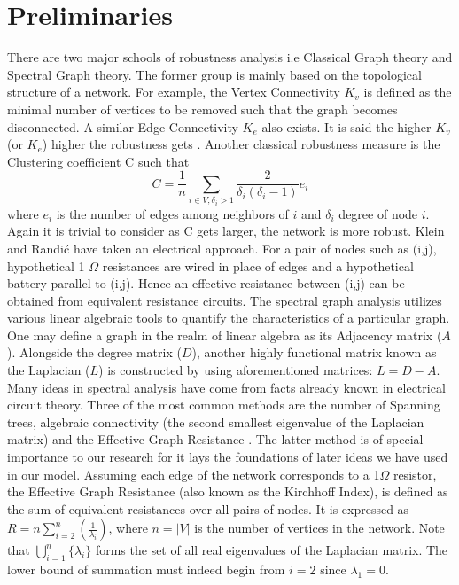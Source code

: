 \documentclass{article}
\begin{document}
	\section{Preliminaries}
	There are two major schools of robustness analysis i.e Classical Graph theory and Spectral Graph theory. The former group is mainly based on the topological structure of a network. For example, the Vertex Connectivity $K_v$ is defined as the minimal number of vertices to be removed such that the graph becomes disconnected. A similar Edge Connectivity $K_e$ also exists. It is said the higher $K_v$ (or $K_e$) higher the robustness gets \cite{ellens2013graph}. Another classical robustness measure is the Clustering coefficient \cite{watts1998collective} C such that
	\begin{equation}
		C = \frac{1}{n} \sum_{i\in V;\delta_i>1}\frac{2}{\delta_i(\delta_i -1)}e_i
	\end{equation}
	where $e_i$ is the number of edges among neighbors of $i$ and $\delta_i$ degree of node $i$. Again it is trivial to consider as C gets larger, the network is more robust.
	Klein and Randi\'{c} \cite{klein1993m} have taken an electrical approach. For a pair of nodes such as (i,j), hypothetical 1 $\Omega$ resistances are wired in place of edges and a hypothetical battery parallel to (i,j). Hence an effective resistance between (i,j) can be obtained from equivalent resistance circuits.
	The spectral graph analysis utilizes various linear algebraic tools to quantify the characteristics of a particular graph. One may define a graph in the realm of linear algebra as its Adjacency matrix ($A$). Alongside the degree matrix ($D$), another highly functional matrix known as the Laplacian ($L$) is constructed by using aforementioned matrices: $L=D-A$. Many ideas in spectral analysis have come from facts already known in electrical circuit theory. Three of the most common methods are the number of Spanning trees, algebraic connectivity (the second smallest eigenvalue of the Laplacian matrix) and the Effective Graph Resistance \cite{ellens2013graph}. The latter method is of special importance to our research for it lays the foundations of later ideas we have used in our model. 
	Assuming each edge of the network corresponds to a 1$\Omega$ resistor, the Effective Graph Resistance (also known as the Kirchhoff Index), is defined as the sum of equivalent resistances over all pairs of nodes. It is expressed as
	$R = n \sum_{i=2}^{n}(\frac{1}{\lambda_{i}})$, where $n = |V|$ is the number of vertices in the network\cite{klein1993m}\cite{yamashita2021effective}. Note that $\bigcup_{i=1}^{n} \{\lambda_i\}$ forms the set of all real eigenvalues of the Laplacian matrix. The lower bound of summation must indeed begin from $i=2$ since $\lambda_1 = 0$.
	
\end{document}
